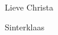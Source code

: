 \documentclass[12pt]{brief}
\date{9 december 2006}
\begin{document}
\begin{letter}{Lieve Christa}

\opening{}


\begin{verse}




\end{verse}


Sinterklaas


\closing{}

\end{letter}
\end{document}
